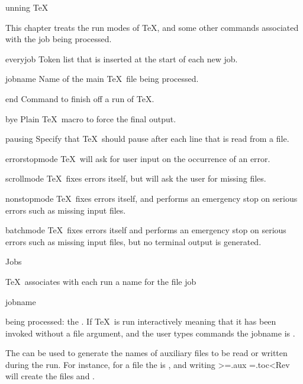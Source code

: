\subject[run] Running \TeX

This chapter treats the run modes of \TeX, and some
other commands associated with the job being processed.

\invent
\item everyjob 
      Token list that is inserted at the start of each new job.

\item jobname 
      Name of the main \TeX\ file being processed.

\item end 
      Command to finish off a run of \TeX.

\item bye
      Plain \TeX\ macro to force the final output.

\item pausing 
      Specify that \TeX\ should pause after each line that is 
      read from a file.

\item errorstopmode
      \TeX\ will ask for user input on the occurrence of an error.

\item scrollmode 
      \TeX\ fixes errors itself,
      but will ask the user for missing files.

\item nonstopmode 
      \TeX\ fixes errors itself, 
      and performs an emergency stop on serious errors 
      such as missing input files.

\item batchmode 
      \TeX\ fixes errors itself 
      and performs an emergency stop on serious errors 
      such as missing input files,
      but no terminal output is generated.

\inventstop

\point Jobs

\TeX\ associates with each run a name for the file
\term job\par\csterm jobname\par
being processed: the . If \TeX\ is run
interactively
\ldash meaning that it has been invoked without a file argument,
and the user types commands \rdash
the jobname is .

The  can be used to generate
the names of auxiliary files to be read or
written during the run. For instance, for a file 
the  is , and writing
\Ver>\openout\Auxiliary=\jobname.aux
\openout\TableOfContents=\jobname.toc<Rev
will create the files  and .

